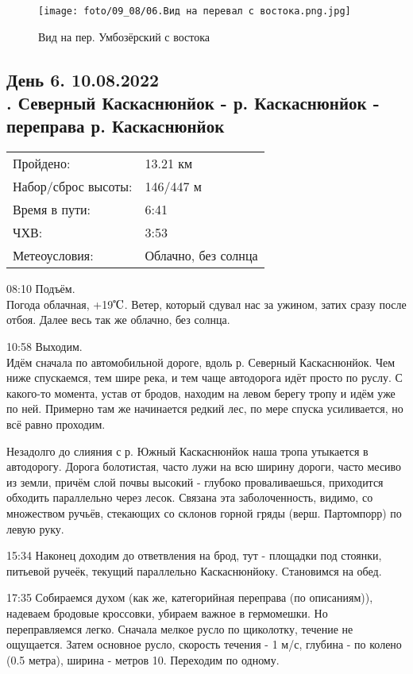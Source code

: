 \begin{figure}[H]
    \centering
    \texttt{[image: foto/09\_08/06.Вид на перевал с востока.png.jpg]}
    \caption{Вид на пер. Умбозёрский с востока}
\end{figure}

\subsection{День 6. 10.08.2022\\
. Северный Каскаснюнйок - р. Каскаснюнйок - переправа р. Каскаснюнйок}
\begin{tabular}{l p{12cm}}
\hline
Пройдено: & 13.21 км\\
Набор/сброс высоты: & 146/447 м\\
Время в пути: & 6:41\\
ЧХВ: & 3:53\\
Метеоусловия: & Облачно, без солнца\\
\hline
\end{tabular}

08:10 Подъём.\\
Погода облачная, +19$\tccentigrade$. Ветер, который сдувал нас за ужином, затих сразу после отбоя.
Далее весь так же облачно, без солнца.

10:58 Выходим.\\
Идём сначала по автомобильной дороге, вдоль р. Северный Каскаснюнйок. Чем ниже спускаемся, тем шире река,
и тем чаще автодорога идёт просто по руслу. С какого-то момента, устав от бродов, находим на левом берегу тропу
и идём уже по ней.  Примерно там же начинается редкий лес, по мере спуска усиливается, но всё равно проходим.

Незадолго до слияния с р. Южный Каскаснюнйок наша тропа утыкается в автодорогу.
Дорога болотистая, часто лужи на всю ширину дороги, часто месиво из земли, причём слой почвы высокий - глубоко проваливаешься,
приходится обходить параллельно через лесок. Связана эта заболоченность, видимо, со множеством ручьёв,
стекающих со склонов горной гряды (верш. Партомпорр) по левую руку.

15:34 Наконец доходим до ответвления на брод, тут - площадки под стоянки, питьевой ручеёк, текущий параллельно Каскаснюнйоку.
Становимся на обед.

17:35 Собираемся духом (как же, категорийная переправа (по описаниям)), надеваем бродовые кроссовки,
убираем важное в гермомешки. Но переправляемся легко. Сначала мелкое русло по щиколотку, течение не ощущается.
Затем основное русло, скорость течения - 1 м/с, глубина - по колено (0.5 метра), ширина - метров 10. Переходим по одному.

